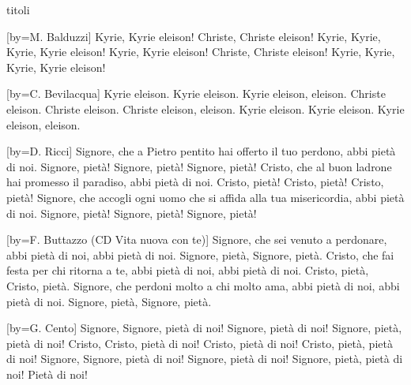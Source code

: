 \begin{songs}{titoli}

[by={M. Balduzzi}]
\beginverse
Kyrie, Kyrie eleison! Christe, Christe eleison!
Kyrie, Kyrie, Kyrie, Kyrie eleison!
\endverse
\beginverse
Kyrie, Kyrie eleison! Christe, Christe eleison!
Kyrie, Kyrie, Kyrie, Kyrie eleison!
\endverse
\endsong

[by={C. Bevilacqua}]
\beginverse
Kyrie eleison. Kyrie eleison.
Kyrie eleison, eleison.
\endverse
\beginverse
Christe eleison. Christe eleison.
Christe eleison, eleison.
\endverse
\beginverse
Kyrie eleison. Kyrie eleison.
Kyrie eleison, eleison.
\endverse
\endsong

[by={D. Ricci}]
\beginverse
Signore, che a Pietro pentito hai offerto il tuo perdono,
abbi pietà di noi.
Signore, pietà! Signore, pietà! Signore, pietà! 
\endverse
\beginverse
Cristo, che al buon ladrone hai promesso il paradiso,
abbi pietà di noi.
Cristo, pietà! Cristo, pietà! Cristo, pietà! 
\endverse
\beginverse
Signore, che accogli ogni uomo che si affida alla tua misericordia,
abbi pietà di noi.
Signore, pietà! Signore, pietà! Signore, pietà! 
\endverse
\endsong

[by={F. Buttazzo (CD Vita nuova con te)}]
\beginverse
Signore, che sei venuto a perdonare,
abbi pietà di noi,
abbi pietà di noi.
Signore, pietà, Signore, pietà.
\endverse
\beginverse
Cristo, che fai festa per chi ritorna a te,
abbi pietà di noi,
abbi pietà di noi.
Cristo, pietà, Cristo, pietà.
\endverse
\beginverse
Signore, che perdoni molto a chi molto ama,
abbi pietà di noi,
abbi pietà di noi.
Signore, pietà, Signore, pietà.
\endverse
\endsong

[by={G. Cento}]
\beginverse
Signore, Signore, pietà di noi!
Signore, pietà di noi! Signore, pietà, pietà di noi!
\endverse
\beginverse
Cristo, Cristo, pietà di noi!
Cristo, pietà di noi! Cristo, pietà, pietà di noi!
\endverse
\beginverse
Signore, Signore, pietà di noi!
Signore, pietà di noi! Signore, pietà, pietà di noi!
Pietà di noi!
\endverse
\endsong

\end{songs}
